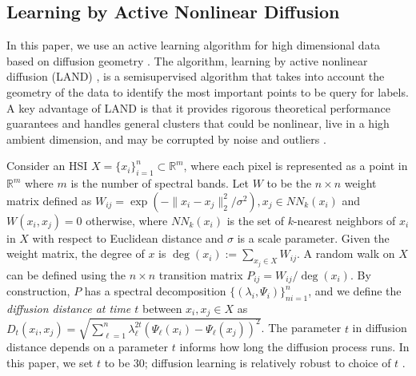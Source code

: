 \documentclass{article}
\def\R{\mathbb{R}}
\def\R{{\mathbb R}}
\begin{document}
\subsection{Learning by Active Nonlinear Diffusion}
In this paper, we use an active learning algorithm for high dimensional data based on diffusion geometry \cite{Murphy2019_Unsupervised, Maggioni2019_LUND, Murphy2020_Spectral}. The algorithm, learning by active nonlinear diffusion (LAND) \cite{Maggioni2019_LAND}, is a semisupervised algorithm that takes into account the geometry of the data to identify the most important points to be query for labels. A key advantage of LAND is that it provides rigorous theoretical performance guarantees and handles general clusters that could be nonlinear, live in a high ambient dimension, and may be corrupted by noise and outliers \cite{Maggioni2019_LAND}.

Consider an HSI $X=\{x_{i}\}_{i=1}^{n}\subset\mathbb{R}^{m}$, where each pixel is represented as a point in $\R^{m}$ where $m$ is the number of spectral bands. Let $W$ to be the $n\times n$ weight matrix defined as $W_{ij}=\exp(-\|x_{i}-x_{j}\|_{2}^{2}/\sigma^{2}), x_{j}\in NN_{k}(x_{i})$ and $W(x_{i},x_{j})=0$ otherwise, where $NN_{k}(x_{i})$ is the set of $k$-nearest neighbors of $x_{i}$ in $X$ with respect to Euclidean distance and $\sigma$ is a scale parameter. Given the weight matrix, the degree of $x$ is $\deg(x_{i}):=\sum_{x_{j}\in X}W_{ij}$. A random walk on $X$ can be defined using the $n\times n$ transition matrix $P_{ij}={W_{ij}}\big/{\deg(x_{i})}.$  
By construction, $P$ has a spectral decomposition $\{(\lambda_{i},\Psi_{i})\}_{ni=1}^{n}$, and we define the \emph{diffusion distance at time $t$} between $x_{i},x_{j}\in X$ as $D_{t}(x_{i},x_{j})=\sqrt{\sum\nolimits_{\ell=1}^{n}\lambda_{\ell}^{2t}(\Psi_{\ell}(x_{i})-\Psi_{\ell}(x_{j}))^{2}}$.  The parameter $t$ in diffusion distance depends on a parameter $t$ informs how long the diffusion process runs.  In this paper, we set $t$ to be 30; diffusion learning is relatively robust to choice of $t$ \cite{Murphy2019_Unsupervised}. 
\end{document}

